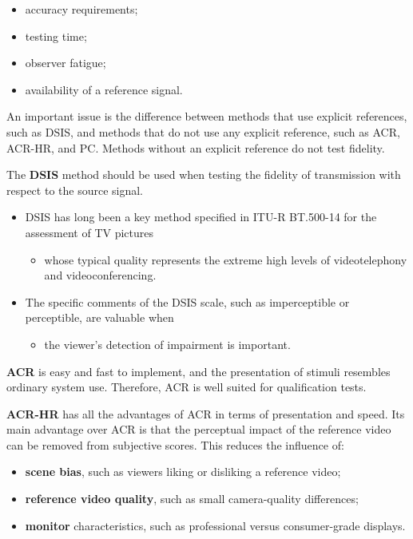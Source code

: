 \begin{itemize}
\item accuracy requirements;
\item testing time;
\item observer fatigue;
\item availability of a reference signal.
\end{itemize}

An important issue is the difference between methods that use explicit references, such as DSIS, and methods that do not use any explicit reference, such as ACR, ACR-HR, and PC. Methods without an explicit reference do not test fidelity.

The \textbf{DSIS} method should be used when testing the fidelity of transmission with respect to the source signal.

\begin{itemize}
\item DSIS has long been a key method specified in ITU-R BT.500-14 for the assessment of TV pictures
\begin{itemize}
\item whose typical quality represents the extreme high levels of videotelephony and videoconferencing.
\end{itemize}
\item The specific comments of the DSIS scale, such as imperceptible or perceptible, are valuable when
\begin{itemize}
\item the viewer's detection of impairment is important.
\end{itemize}
\end{itemize}

\textbf{ACR} is easy and fast to implement, and the presentation of stimuli resembles ordinary system use. Therefore, ACR is well suited for qualification tests.

\textbf{ACR-HR} has all the advantages of ACR in terms of presentation and speed. Its main advantage over ACR is that the perceptual impact of the reference video can be removed from subjective scores. This reduces the influence of:

\begin{itemize}
\item \textbf{scene bias}, such as viewers liking or disliking a reference video;
\item \textbf{reference video quality}, such as small camera-quality differences;
\item \textbf{monitor} characteristics, such as professional versus consumer-grade displays.
\end{itemize}

